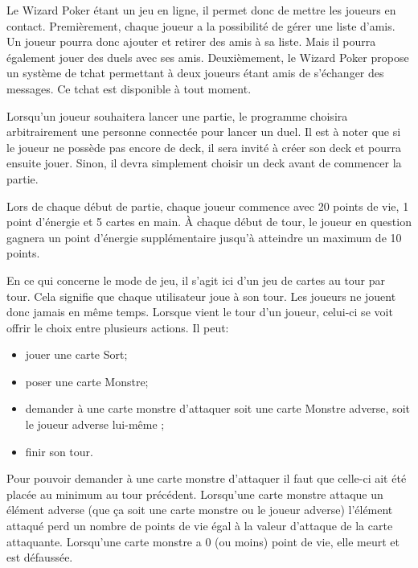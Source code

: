 \documentclass[11pt,a4paper]{article}
\begin{document}
Le Wizard Poker étant un jeu en ligne, il permet donc de mettre les joueurs en contact. Premièrement, chaque joueur a la possibilité de gérer une liste d'amis. Un joueur pourra donc ajouter et retirer des amis à sa liste. Mais il pourra également jouer des duels avec ses amis. Deuxièmement, le Wizard Poker propose un système de \gls{tchat} permettant à deux joueurs étant amis de s'échanger des messages.  Ce tchat est disponible à tout moment.

\medbreak

Lorsqu'un joueur souhaitera lancer une partie, le programme choisira arbitrairement une personne connectée pour lancer un duel. Il est à noter que si le joueur ne possède pas encore de deck, il sera invité à créer son deck et pourra ensuite jouer. Sinon, il devra simplement choisir un deck avant de commencer la partie.

\medbreak

Lors de chaque début de partie, chaque joueur commence avec 20 points de vie, 1 point d'énergie et 5 cartes en main. À chaque début de tour, le joueur en question gagnera un point d'énergie supplémentaire jusqu'à atteindre un maximum de 10 points.

\medbreak

En ce qui concerne le mode de jeu, il s'agit ici d'un jeu de cartes au tour par tour.  Cela signifie que chaque utilisateur joue à son tour.  Les joueurs ne jouent donc jamais en même temps.  Lorsque vient le tour d'un joueur, celui-ci se voit offrir le choix entre plusieurs actions. Il peut:

\begin{itemize}
 \item[\textbullet] jouer une carte Sort;
 \item[\textbullet] poser une carte Monstre;
 \item[\textbullet] demander à une carte monstre d'attaquer soit une carte Monstre adverse, soit le joueur adverse lui-même ;
 \item[\textbullet] finir son tour.
\end{itemize}

Pour pouvoir demander à une carte monstre d'attaquer il faut que celle-ci ait été placée au minimum au tour précédent.  Lorsqu'une carte monstre attaque un élément adverse (que ça soit une carte monstre ou le joueur adverse) l'élément attaqué perd un nombre de points de vie égal à la valeur d'attaque de la carte attaquante. Lorsqu'une carte monstre a 0 (ou moins) point de vie, elle meurt et est défaussée.
\end{document}
